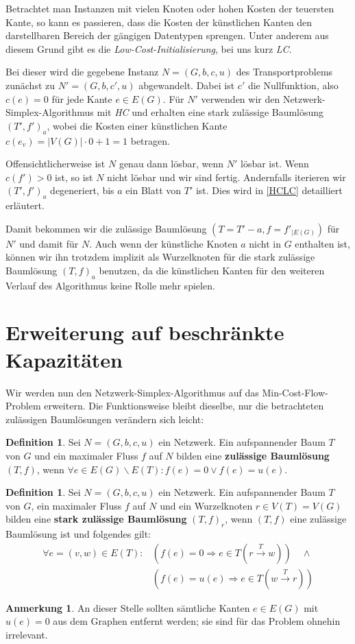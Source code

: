 \documentclass[a4paper,twoside,ngerman]{report}
\theoremstyle{plain}
\theoremstyle{definition}
\newtheorem{defn}[thm]{Definition}
\newtheorem*{anm}{Anmerkung}
\begin{document}
Betrachtet man Instanzen mit vielen Knoten oder hohen Kosten der teuersten Kante, so kann es passieren, dass die Kosten der künstlichen Kanten den darstellbaren Bereich der gängigen Datentypen sprengen. Unter anderem aus diesem Grund gibt es die \emph{Low-Cost-Initialisierung}, bei uns kurz \emph{LC}.

Bei dieser wird die gegebene Instanz $N=(G,b,c,u)$ des Transportproblems zunächst zu $N'=(G,b,c',u)$ abgewandelt. Dabei ist $c'$ die Nullfunktion, also $c(e)=0$ für jede Kante $e\in E(G)$. Für $N'$ verwenden wir den Netzwerk-Simplex-Algorithmus mit \emph{HC} und erhalten eine stark zulässige Baumlösung $(T',f')_a$, wobei die Kosten einer künstlichen Kante $c(e_v)=|V(G)|\cdot0+1=1$ betragen.

Offensichtlicherweise ist $N$ genau dann lösbar, wenn $N'$ lösbar ist. Wenn $c(f')>0$ ist, so ist $N$ nicht lösbar und wir sind fertig. Andernfalls iterieren wir $(T',f')_a$ degeneriert, bis $a$ ein Blatt von $T'$ ist. Dies wird in \cref{HCLC} detailliert erläutert.

Damit bekommen wir die zulässige Baumlösung $(T=T'-a, f=f'_{|E(G)})$ für $N'$ und damit für $N$. Auch wenn der künstliche Knoten $a$ nicht in $G$ enthalten ist, können wir ihn trotzdem implizit als Wurzelknoten für die stark zulässige Baumlösung $(T,f)_a$ benutzen, da die künstlichen Kanten für den weiteren Verlauf des Algorithmus keine Rolle mehr spielen.

\section{Erweiterung auf beschränkte Kapazitäten}\label{ch:alg2}
Wir werden nun den Netzwerk-Simplex-Algorithmus auf das Min-Cost-Flow-Problem erweitern. Die Funktionsweise bleibt dieselbe, nur die betrachteten zulässigen Baumlösungen verändern sich leicht:

\begin{defn}Sei $N=(G,b,c,u)$ ein Netzwerk. Ein aufspannender Baum $T$ von $G$ und ein maximaler Fluss $f$ auf $N$ bilden eine \textbf{zulässige Baumlösung} $(T,f)$, wenn $\forall e\in E(G)\backslash E(T): f(e) = 0\vee f(e)=u(e)$.\end{defn}

\begin{defn}Sei $N=(G,b,c,u)$ ein Netzwerk. Ein aufspannender Baum $T$ von $G$, ein maximaler Fluss $f$ auf $N$ und ein Wurzelknoten $r\in V(T)=V(G)$ bilden eine \textbf{stark zulässige Baumlösung} $(T,f)_r$, wenn $(T,f)$ eine zulässige Baumlösung ist und folgendes gilt:
\begin{align*}
\forall e=(v,w)\in E(T): &{}(f(e)=0 \Rightarrow e\in T(r\xrightarrow{T}w))\quad\wedge\\
&{}(f(e)=u(e) \Rightarrow e\in T(w\xrightarrow{T}r))
\end{align*}\end{defn}
\begin{anm}An dieser Stelle sollten sämtliche Kanten $e\in E(G)$ mit $u(e)=0$ aus dem Graphen entfernt werden; sie sind für das Problem ohnehin irrelevant.\end{anm}
\end{document}
